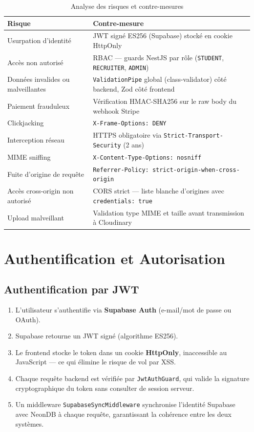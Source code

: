 ﻿\documentclass[12pt,a4paper]{report}
\begin{document}
\begin{table}[H]
\centering
\begin{tabularx}{\textwidth}{lX}
\toprule
\textbf{Risque} & \textbf{Contre-mesure} \\
\midrule
Usurpation d'identité & JWT signé ES256 (Supabase) stocké en cookie HttpOnly \\
Accès non autorisé & RBAC — guards NestJS par rôle (\texttt{STUDENT}, \texttt{RECRUITER}, \texttt{ADMIN}) \\
Données invalides ou malveillantes & \texttt{ValidationPipe} global (class-validator) côté backend, Zod côté frontend \\
Paiement frauduleux & Vérification HMAC-SHA256 sur le raw body du webhook Stripe \\
Clickjacking & \texttt{X-Frame-Options: DENY} \\
Interception réseau & HTTPS obligatoire via \texttt{Strict-Transport-Security} (2 ans) \\
MIME sniffing & \texttt{X-Content-Type-Options: nosniff} \\
Fuite d'origine de requête & \texttt{Referrer-Policy: strict-origin-when-cross-origin} \\
Accès cross-origin non autorisé & CORS strict — liste blanche d'origines avec \texttt{credentials: true} \\
Upload malveillant & Validation type MIME et taille avant transmission à Cloudinary \\
\bottomrule
\end{tabularx}
\caption{Analyse des risques et contre-mesures}
\end{table}

\section{Authentification et Autorisation}

\subsection{Authentification par JWT}

\begin{enumerate}
  \item L'utilisateur s'authentifie via \textbf{Supabase Auth} (e-mail/mot de passe ou OAuth).
  \item Supabase retourne un \ac{JWT} signé (algorithme ES256).
  \item Le frontend stocke le token dans un cookie \textbf{HttpOnly}, inaccessible au JavaScript — ce qui élimine le risque de vol par XSS.
  \item Chaque requête backend est vérifiée par \texttt{JwtAuthGuard}, qui valide la signature cryptographique du token sans consulter de session serveur.
  \item Un middleware \texttt{SupabaseSyncMiddleware} synchronise l'identité Supabase avec NeonDB à chaque requête, garantissant la cohérence entre les deux systèmes.
\end{enumerate}
\end{document}

